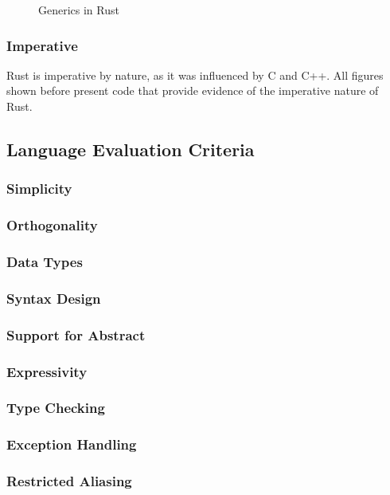 \documentclass{article}
\newcommand{\rust}[1]{\inputminted{rust}{samples/rust/#1.rs}}
\begin{document}
  \begin{figure}[ht]
    \rust{iterator}
    \caption{Generics in Rust}
    \label{fig:generic}
  \end{figure}


  \subsubsection{Imperative}
  Rust is imperative by nature, as it was influenced by C and C++. All figures
  shown before present code that provide evidence of the imperative nature of
  Rust.

  \subsection{Language Evaluation Criteria}

  \subsubsection{Simplicity}

  \subsubsection{Orthogonality}

  \subsubsection{Data Types}

  \subsubsection{Syntax Design}

  \subsubsection{Support for Abstract}

  \subsubsection{Expressivity}

  \subsubsection{Type Checking}

  \subsubsection{Exception Handling}

  \subsubsection{Restricted Aliasing}

  \newpage
  \nocite{*} \printbibliography[heading=bibintoc,title={References}]{}
\end{document}
